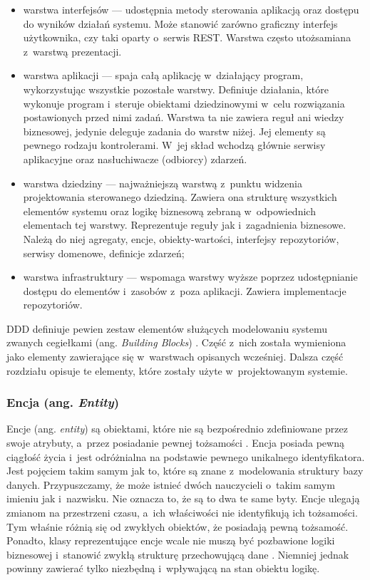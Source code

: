 \documentclass[a4paper]{book}
\newcommand{\obcy}[2]{{\selectlanguage{#1}#2}}
\newcommand{\ang}[1]{\emph{\obcy{british}{#1}}}
\begin{document}
{\begin{itemize}
	\item warstwa interfejsów --- udostępnia metody sterowania aplikacją oraz dostępu do wyników działań systemu. Może stanowić zarówno graficzny interfejs użytkownika, czy taki oparty o~serwis REST. Warstwa często utożsamiana z~warstwą prezentacji. 
	\item warstwa aplikacji --- spaja całą aplikację w~działający program, wykorzystując wszystkie pozostałe warstwy. Definiuje działania, które wykonuje program i~steruje obiektami dziedzinowymi w~celu rozwiązania postawionych przed nimi zadań. Warstwa ta nie zawiera reguł ani wiedzy biznesowej, jedynie deleguje zadania do warstw niżej. Jej elementy są pewnego rodzaju kontrolerami. W~jej skład wchodzą głównie serwisy aplikacyjne oraz nasłuchiwacze (odbiorcy) zdarzeń.
	\item warstwa dziedziny --- najważniejszą warstwą z~punktu widzenia projektowania sterowanego dziedziną. Zawiera ona strukturę wszystkich elementów systemu oraz logikę biznesową zebraną w~odpowiednich elementach tej warstwy. Reprezentuje reguły jak i~zagadnienia biznesowe. Należą do niej agregaty, encje, obiekty-wartości, interfejsy repozytoriów, serwisy domenowe, definicje zdarzeń;
	\item warstwa infrastruktury --- wspomaga warstwy wyższe poprzez udostępnianie dostępu do elementów i~zasobów z~poza aplikacji. Zawiera implementacje repozytoriów.  
\end{itemize}

DDD definiuje pewien zestaw elementów służących modelowaniu systemu zwanych cegiełkami (ang. \ang{Building Blocks}) \cite{id:sobotka_SDJ-DDD}. Część z~nich została wymieniona jako elementy zawierające się w~warstwach opisanych wcześniej. Dalsza część rozdziału opisuje te elementy, które zostały użyte w~projektowanym systemie.

\subsubsection{Encja (ang. \ang{Entity})}

Encje (ang. \ang{entity}) są obiektami, które nie są bezpośrednio zdefiniowane przez swoje atrybuty, a~przez posiadanie pewnej tożsamości \cite{id:DDD_Evans}. Encja posiada pewną ciągłość życia i~jest odróżnialna na podstawie pewnego unikalnego identyfikatora. Jest pojęciem takim samym jak to, które są znane z~modelowania struktury bazy danych. Przypuszczamy, że może istnieć dwóch nauczycieli o~takim samym imieniu jak i~nazwisku. Nie oznacza to, że są to dwa te same byty. Encje ulegają zmianom na przestrzeni czasu, a~ich właściwości nie identyfikują ich tożsamości. Tym właśnie różnią się od zwykłych obiektów, że posiadają pewną tożsamość. Ponadto, klasy reprezentujące encje wcale nie muszą być pozbawione logiki biznesowej i~stanowić zwykłą strukturę przechowującą dane \cite{id:sobotka_SDJ-DDD}. Niemniej jednak powinny zawierać tylko niezbędną i~wpływającą na stan obiektu logikę.

}
\end{document}
